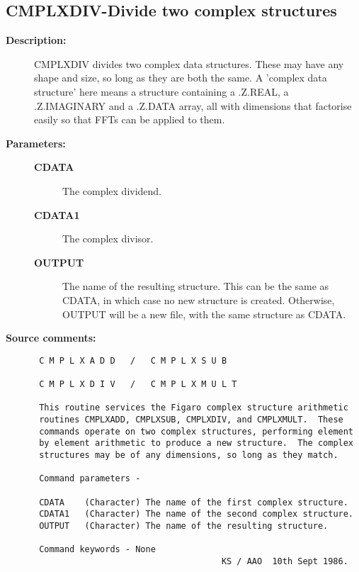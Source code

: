 \subsection{CMPLXDIV-\label{CMPLXDIV}Divide two complex structures}
\begin{description}

\item [{\bf Description:}]
 CMPLXDIV  divides  two complex  data  structures.  These  may
 have any shape and size, so long as they are both the same.  A
 'complex data structure' here means a structure containing a
 .Z.REAL, a .Z.IMAGINARY and a .Z.DATA array, all with dimensions
 that factorise easily so that FFTs can be applied to them.

\item [{\bf Parameters:}]
\begin{description}
\item [{\bf CDATA}]
 The complex dividend.
\item [{\bf CDATA1}]
 The complex divisor.
\item [{\bf OUTPUT}]
 The name of the resulting structure. This can
 be the same as CDATA, in which case no new structure is
 created.  Otherwise, OUTPUT will be a new file, with the
 same structure as CDATA.
\end{description}

\item [{\bf Source comments:}]
\begin{verbatim}
 C M P L X A D D   /   C M P L X S U B

 C M P L X D I V   /   C M P L X M U L T

 This routine services the Figaro complex structure arithmetic
 routines CMPLXADD, CMPLXSUB, CMPLXDIV, and CMPLXMULT.  These
 commands operate on two complex structures, performing element
 by element arithmetic to produce a new structure.  The complex
 structures may be of any dimensions, so long as they match.

 Command parameters -

 CDATA    (Character) The name of the first complex structure.
 CDATA1   (Character) The name of the second complex structure.
 OUTPUT   (Character) The name of the resulting structure.

 Command keywords - None
                                     KS / AAO  10th Sept 1986.
\end{verbatim}
\end{description}
